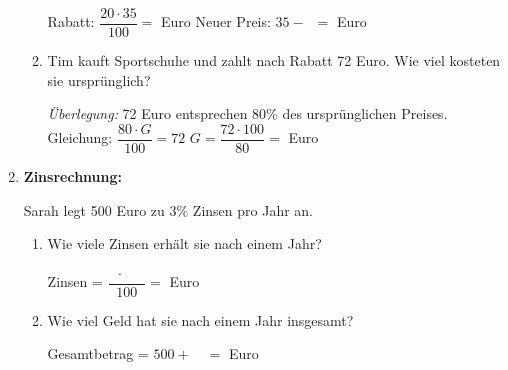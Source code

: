 \begin{enumerate}[label=\arabic*., resume]
\begin{enumerate}[label=\alph*)]
        \vspace{0.3cm}
        Rabatt: $\dfrac{20 \cdot 35}{100} = $ \underline{\hspace{2cm}} Euro
        \vspace{0.3cm}
        Neuer Preis: $35 - \phantom{0} = $ \underline{\hspace{2cm}} Euro

        \vspace{0.5cm}

        \item Tim kauft Sportschuhe und zahlt nach Rabatt 72 Euro. Wie viel kosteten sie ursprünglich?

        \vspace{0.3cm}
        \textit{Überlegung:} 72 Euro entsprechen 80\% des ursprünglichen Preises.
        \vspace{0.3cm}
        Gleichung: $\dfrac{80 \cdot G}{100} = 72$
        \vspace{0.3cm}
        $G = \dfrac{72 \cdot 100}{80} = $ \underline{\hspace{2cm}} Euro

    \end{enumerate}

    \vspace{1cm}

    \item \textbf{Zinsrechnung:}

    Sarah legt 500 Euro zu 3\% Zinsen pro Jahr an.

    \vspace{0.5cm}

    \begin{enumerate}[label=\alph*)]
        \item Wie viele Zinsen erhält sie nach einem Jahr?

        \vspace{0.3cm}
        Zinsen = $\dfrac{\phantom{0} \cdot \phantom{000}}{100} = $ \underline{\hspace{2cm}} Euro

        \vspace{0.5cm}

        \item Wie viel Geld hat sie nach einem Jahr insgesamt?

        \vspace{0.3cm}
        Gesamtbetrag = $500 + \phantom{00} = $ \underline{\hspace{2cm}} Euro

    \end{enumerate}


\end{enumerate}
